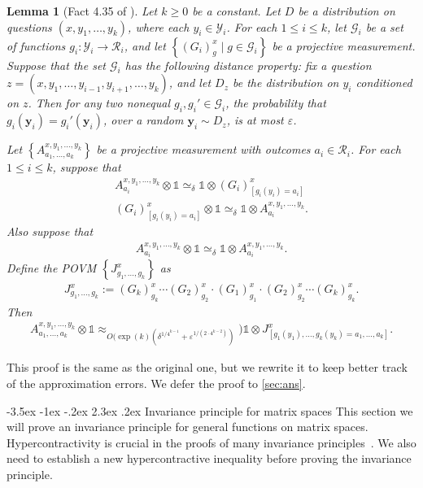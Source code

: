 \documentclass[10pt,a4paper]{article}
\makeatletter
\renewcommand{\section}{\@startsection {section}{1}{\z@}%
             {-3.5ex \@plus -1ex \@minus -.2ex}%
             {2.3ex \@plus .2ex}%
             {\normalfont\Large\scshape\bfseries}}
\theoremstyle{plain}
\newtheorem{lemma}[theorem]{Lemma}
\theoremstyle{definition}
\newcommand {\set} [1] {\ensuremath{ \left\lbrace #1 \right\rbrace }}
\newcommand {\id} {\ensuremath{\mathds{1}}}
\newcommand{\ep} {\ensuremath{\varepsilon}}
\newcommand{\x}{\otimes}
\newcommand{\calY}{\mathcal{Y}}
\newcommand{\calG}{\mathcal{G}}
\newcommand{\calR}{\mathcal{R}}
\newcommand{\appd}[1]{\approx_{#1}}
\newcommand{\1}{\mathbb{1}} %
\newcommand{\by}{\pmb{y}}
\makeatother
\begin{document}
\begin{lemma}[Fact 4.35 of \cite{neexp}]
	\label{lm:k_prod_distr}
	Let $k \geq 0$ be a constant.
	Let $D$ be a distribution on questions $(x, y_1, \ldots, y_k)$, where
	each $y_i \in \calY_i$. For each $1 \leq i \leq k$, let $\calG_i$ be a set of functions $g_i : \calY_i \to \calR_i$,
	and let $\set{ (G_i)^x_g \mid g \in \calG_i}$ be a projective measurement.
	Suppose that the set $\calG_i$ has the following distance property: fix a question
	$z = (x, y_1,\ldots, y_{i-1}, y_{i+1},\ldots, y_k)$, and let $D_z$ be the distribution on $y_i$ conditioned on $z$.
	Then for any two nonequal $g_i, g_i' \in \calG_i$, the probability that $g_i(\by_i) = g_i'(\by_i)$, over a random 
	$\by_i \sim D_z$, is at most $\ep$.
	
	Let $\set{ A^{x,y_1,\ldots, y_k}_{a_1,\ldots, a_k}}$ be a projective measurement with outcomes $a_i \in \calR_i$.
	For each $1 \leq i \leq k$, suppose that 
	\begin{align}
		\label{eq:A_G_consist}
		A^{x,y_1, \ldots, y_k}_{a_i} \x \id \simeq_{\delta} \id \x (G_i)^x_{[g_i(y_i)=a_i]}  \\
		\label{eq:G_A_consist}
		(G_i)^x_{[g_i(y_i)=a_i]} \x \id \simeq_{\delta} \id \x A^{x,y_1, \ldots, y_k}_{a_i}.
	\end{align}
	Also suppose that 
	\begin{align}
		\label{eq:A_consist}
		A^{x,y_1, \ldots, y_k}_{a_i} \x \id \simeq_{\delta} \id \x A^{x,y_1, \ldots, y_k}_{a_i}. 
	\end{align}
	Define the POVM $\set{ J^x_{g_1, \ldots, g_k} }$ as
	\begin{align*}
		J^x_{g_1, \ldots, g_k}:= (G_k)^x_{g_k} \cdots (G_2)^x_{g_2} \cdot (G_1)^x_{g_1} \cdot (G_2)^x_{g_2}
		\cdots (G_k)^x_{g_k}.
	\end{align*}
	Then
	\begin{align*}
		A^{x,y_1, \ldots, y_k}_{a_1,\ldots, a_k} \x \id \appd{O(\exp(k) (\delta^{1/4^{k-1}} + \ep^{1/(2\cdot 4^{k-2})})}) \id \x J^x_{[g_1(y_1),\ldots, g_k(y_k) = a_1, \ldots, a_k]}.
	\end{align*}
\end{lemma}
This proof is the same as the original one, but we rewrite it to keep better track of the approximation errors.
We defer the proof to \cref{sec:ans}.


%
\section{Invariance principle for matrix spaces}\label{sec:invariance}
This section we will prove an invariance principle for general functions on matrix spaces. Hypercontractivity is crucial in the proofs of many invariance principles~\cite{mossel2005noise,isaksson2012maximally,10.1145/2395116.2395118,qin2021nonlocal,10.1145/3519935.3519965}. We also need to establish a new hypercontractive inequality before proving the invariance principle.
\end{document}
